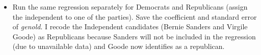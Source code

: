 \documentclass[
]{article}
\newenvironment{Shaded}{\begin{snugshade}}{\end{snugshade}}
\newcommand{\DecValTok}[1]{\textcolor[rgb]{0.00,0.00,0.81}{#1}}
\newcommand{\KeywordTok}[1]{\textcolor[rgb]{0.13,0.29,0.53}{\textbf{#1}}}
\newcommand{\NormalTok}[1]{#1}
\newcommand{\OperatorTok}[1]{\textcolor[rgb]{0.81,0.36,0.00}{\textbf{#1}}}
\newcommand{\StringTok}[1]{\textcolor[rgb]{0.31,0.60,0.02}{#1}}
\providecommand{\tightlist}{%
  \setlength{\itemsep}{0pt}\setlength{\parskip}{0pt}}
\begin{document}
\begin{Shaded}
\end{Shaded}

\begin{itemize}
\tightlist
\item
  Run the same regression separately for Democrats and Republicans
  (assign the independent to one of the parties). Save the coefficient
  and standard error of \emph{genold}. I recode the Independent
  candidates (Bernie Sanders and Virgile Goode) as Republicans because
  Sanders will not be included in the regression (due to unavailable
  data) and Goode now identifies as a republican.
\end{itemize}
\end{document}
